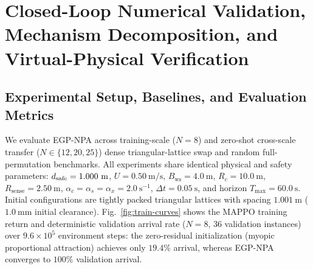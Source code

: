 \section{Closed-Loop Numerical Validation, Mechanism Decomposition, and Virtual-Physical Verification}\label{sec:experiments}

\subsection{Experimental Setup, Baselines, and Evaluation Metrics}
We evaluate EGP-NPA across training-scale ($N=8$) and zero-shot cross-scale transfer ($N\in\{12,20,25\}$) dense triangular-lattice swap and random full-permutation benchmarks. All experiments share identical physical and safety parameters: $d_{\mathrm{safe}}=1.000\ \mathrm m$, $U=0.50\ \mathrm{m/s}$, $B_{\mathrm{ws}}=4.0\ \mathrm m$, $R_c=10.0\ \mathrm m$, $R_{\mathrm{sense}}=2.50\ \mathrm m$, $\alpha_c=\alpha_s=\alpha_x=2.0\ \mathrm s^{-1}$, $\Delta t=0.05\ \mathrm s$, and horizon $T_{\max}=60.0\ \mathrm s$. Initial configurations are tightly packed triangular lattices with spacing $1.001\ \mathrm m$ ($1.0\ \mathrm{mm}$ initial clearance). Fig.~\ref{fig:train-curves} shows the MAPPO training return and deterministic validation arrival rate ($N=8$, $36$ validation instances) over $9.6\times 10^5$ environment steps: the zero-residual initialization (myopic proportional attraction) achieves only $19.4\%$ arrival, whereas EGP-NPA converges to $100\%$ validation arrival.

